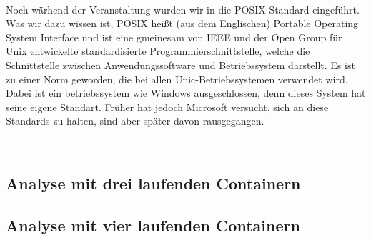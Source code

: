 \\


Noch wärhend der Veranstaltung wurden wir in die POSIX-Standard eingeführt. Was wir dazu wissen ist, POSIX heißt (aus dem Englischen) Portable Operating System Interface und ist eine gmeinesam von IEEE und der Open Group für Unix entwickelte standardisierte Programmierschnittstelle, welche die Schnittstelle zwischen Anwendungssoftware und Betriebssystem darstellt. Es ist zu einer Norm geworden, die bei allen Unic-Betriebssystemen verwendet wird. Dabei ist ein betriebssystem wie Windows ausgeschlossen, denn dieses System hat seine eigene Standart. Früher hat jedoch Microsoft versucht, sich an diese Standards zu halten, sind aber später davon rausgegangen.

\\



\subsection{Analyse mit drei laufenden Containern}

\subsection{Analyse mit vier laufenden Containern}
